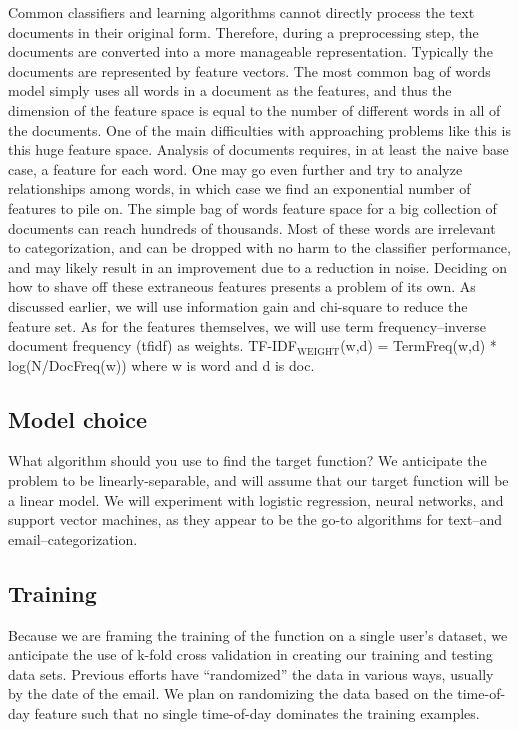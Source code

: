 \documentclass[11pt]{article}
\begin{document}
Common classifiers and learning algorithms cannot directly process the text documents in their original form. Therefore, during a preprocessing step, the documents are converted into a more manageable representation. Typically the documents are represented by feature vectors. The most common bag of words model simply uses all words in a document as the features, and thus the dimension of the feature space is equal to the number of different words in all of the documents.
One of the main difficulties with approaching problems like this is this huge feature space. Analysis of documents requires, in at least the naive base case, a feature for each word. One may go even further and try to analyze relationships among words, in which case we find an exponential number of features to pile on. The simple bag of words feature space for a big collection of documents can reach hundreds of thousands. Most of these words are irrelevant to categorization, and can be dropped with no harm to the classifier performance, and may likely result in an improvement due to a reduction in noise. Deciding on how to shave off these extraneous features presents a problem of its own. As discussed earlier, we will use information gain and chi-square to reduce the feature set.
As for the features themselves, we will use term frequency–inverse document frequency (tfidf) as weights. TF-IDF$_{\mathrm{WEIGHT}}$(w,d) = TermFreq(w,d) * log(N/DocFreq(w)) where w is word and d is doc.
\subsection{Model choice}
\label{sec-4-2}


What algorithm should you use to find the target function?
We anticipate the problem to be linearly-separable, and will assume that our target function will be a linear model. We will experiment with logistic regression, neural networks, and support vector machines, as they appear to be the go-to algorithms for text--and email--categorization.
\subsection{Training}
\label{sec-4-3}


Because we are framing the training of the function on a single user’s dataset, we anticipate the use of k-fold cross validation in creating our training and testing data sets. Previous efforts have “randomized” the data in various ways, usually by the date of the email. We plan on randomizing the data based on the time-of-day feature such that no single time-of-day dominates the training examples.
\end{document}
